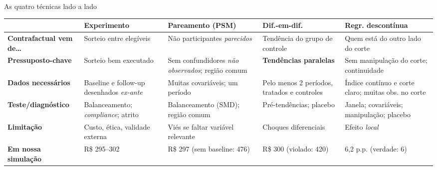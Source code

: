 
\begin{frame}{As quatro técnicas lado a lado}
  \scriptsize
  \renewcommand{\arraystretch}{1.35}
  \begin{tabularx}{\textwidth}{@{}>{\raggedright\arraybackslash}p{1.9cm}YYYY@{}}
    \toprule
    & \textbf{Experimento} & \textbf{Pareamento (PSM)} & \textbf{Dif.-em-dif.} & \textbf{Regr. descontínua} \\ \midrule
    \textbf{Contrafactual vem de\ldots} & Sorteio entre elegíveis & Não participantes \emph{parecidos} & Tendência do grupo de controle & Quem está do outro lado do corte \\
    \textbf{Pressuposto-chave} & Sorteio bem executado & Sem confundidores \emph{não observados}; região comum & \textbf{Tendências paralelas} & Sem manipulação do corte; continuidade \\
    \textbf{Dados necessários} & Baseline e follow-up desenhados \emph{ex-ante} & Muitas covariáveis; um período & Pelo menos 2 períodos, tratados e controles & Índice contínuo e corte claro; muitas obs. no corte \\
    \textbf{Teste/diagnóstico} & Balanceamento; \emph{compliance}; atrito & Balanceamento (SMD); região comum & Pré-tendências; placebo & Janela; covariáveis; manipulação; placebo \\
    \textbf{Limitação} & Custo, ética, validade externa & Viés se faltar variável relevante & Choques diferenciais & Efeito \emph{local} \\
    \textbf{Em nossa simulação} & R\$ 295--302 & R\$ 297 (sem baseline: 476) & R\$ 300 (violado: 420) & 6,2 p.p. (verdade: 6) \\ \bottomrule
  \end{tabularx}
\end{frame}

